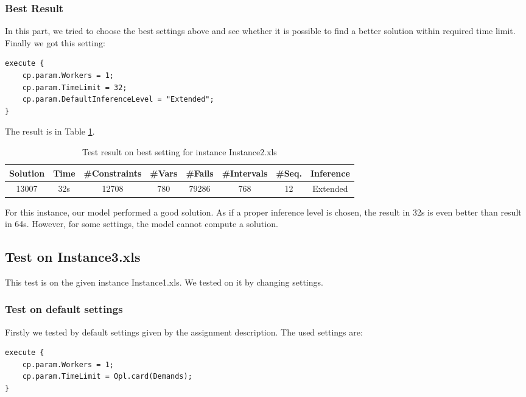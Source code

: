 \documentclass[a4paper, 12pt]{article}
\begin{document}
\subsubsection{Best Result}

In this part, we tried to choose the best settings above and see whether it is possible to find a better solution within required time limit. Finally we got this setting: 

\begin{lstlisting}
execute {
    cp.param.Workers = 1;
    cp.param.TimeLimit = 32; 
    cp.param.DefaultInferenceLevel = "Extended";
}
\end{lstlisting}

The result is in Table \ref{best2}. 

\begin{table}
    \centering
    \caption{Test result on best setting for instance Instance2.xls}
    \label{best2}
    \begin{tabular}{|c|c|c|c|c|c|c|c|}
        \hline
        Solution & Time & \#Constraints & \#Vars & \#Fails & \#Intervals & \#Seq. & Inference \\
        \hline
        13007 & 32s & 12708 & 780 & 79286 & 768 & 12 & Extended \\
        \hline
    \end{tabular}
\end{table}

For this instance, our model performed a good solution. As if a proper inference level is chosen, the result in 32s is even better than result in 64s. However, for some settings, the model cannot compute a solution. 

\subsection{Test on Instance3.xls}

This test is on the given instance Instance1.xls. We tested on it by changing settings. 

\subsubsection{Test on default settings}

Firstly we tested by default settings given by the assignment description. The used settings are: 

\begin{lstlisting}
execute {
    cp.param.Workers = 1;
    cp.param.TimeLimit = Opl.card(Demands); 
}
\end{lstlisting}
\end{document}
